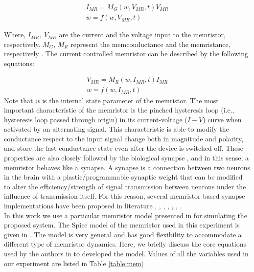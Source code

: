 \documentclass[review]{elsarticle}
\begin{document}
\begin{gather}
I_{MR} =  M_G (w, V_{MR}, t) V_{MR}
\\
w= f(w, V_{MR}, t)
\end{gather}

Where, \textit{$ I_{MR} $, $V_{MR}$} are the current and the voltage input to the memristor, respectively. \textit {$M_G$}, \textit{$ M_R$} represent the memconductance  and the memristance, respectively \cite{Chua1976}. The current controlled memristor can be described by the following equations: \par


\begin{gather}
V_{MR} =  M_R (w,  I_{MR}, t)  I_{MR}    
\\
w = f(w, I_{MR}, t)
\end{gather}
Note that \textit {w} is the internal state parameter of the memristor.
The most important characteristic of the memristor is the pinched hysteresis loop (i.e., hysteresis loop passed through origin) in its current-voltage ($I-V$) curve when activated by an alternating signal. 
 This characteristic is able to modify the conductance respect to the input signal change both in  magnitude and polarity, and store the last conductance state even after the device is switched off. These properties are also closely followed by the biological synapse \cite{Li2014}, \cite{Ohno2011} and in this sense, a memristor behaves like a synapse. A synapse is a connection between two neurons in the brain with a plastic/programmable synaptic weight that can be modified to alter the efficiency/strength of signal transmission between neurons under the influence of transmission itself. For this reason, several memristor based synapse implementations have been proposed in literature  \cite{Indiveri2011}, \cite{Bi1998}, \cite{Serrano2013}, \cite{ZamarrenoRamos2011}, \cite{Wu2015},  \cite{Serrano2012}, \cite{Snider2008}.\\
In this work we use a particular memristor model presented in \cite{Yakopcic2011} for simulating the proposed system. 
The Spice model of the memristor used in this experiment is given in  \cite{Yakopcic2011}. The model is very general and has good flexibility to accommodate a different type of memristor dynamics. Here, we briefly discuss the core equations used by the authors in \cite{Yakopcic2011} to developed the model. Values of all the variables used in our experiment are listed in Table \ref{table:mem}
\end{document}
